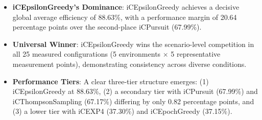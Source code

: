 \documentclass[12pt,a4paper]{article}
\newcommand{\performance}[1]{\textcolor{performancecolor}{\textbf{#1}}}
\begin{document}
\begin{tcolorbox}[colback=performancecolor!10,colframe=performancecolor,title=\textbf{Primary Performance Results (Aggregated Across All Configurations)}]
\begin{itemize}
\item \performance{iCEpsilonGreedy's Dominance}: iCEpsilonGreedy achieves a decisive global average efficiency of 88.63\%, with a performance margin of 20.64 percentage points over the second-place iCPursuit (67.99\%).
\item \performance{Universal Winner}: iCEpsilonGreedy wins the scenario-level competition in all 25 measured configurations (5 environments $\times$ 5 representative measurement points), demonstrating consistency across diverse conditions.
\item \performance{Performance Tiers}: A clear three-tier structure emerges: (1) iCEpsilonGreedy at 88.63\%, (2) a secondary tier with iCPursuit (67.99\%) and iCThompsonSampling (67.17\%) differing by only 0.82 percentage points, and (3) a lower tier with iCEXP4 (37.30\%) and iCEpochGreedy (37.15\%).
\end{itemize}

\end{tcolorbox}
\end{document}
